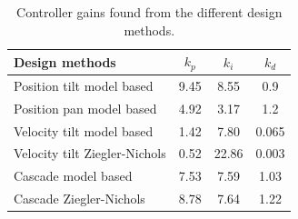 \documentclass[../../main.tex]{subfiles}
\begin{document}
\begin{table}[]
    \centering
    \begin{tabular}{l | c c c}
        Design methods                      & $k_{p}$ & $k_{i}$ & $k_{d}$ \\
        \hline
        Position tilt model based   & 9.45 & 8.55 & 0.9     \\
        Position pan model based    & 4.92 & 3.17 & 1.2     \\
        Velocity tilt model based   & 1.42 & 7.80 & 0.065   \\
        Velocity tilt Ziegler-Nichols & 0.52 & 22.86 & 0.003 \\
        Cascade model based         & 7.53 & 7.59 & 1.03    \\
        Cascade Ziegler-Nichols     & 8.78 & 7.64 & 1.22    \\
    \end{tabular}
    \caption{Controller gains found from the different design methods. }
    \label{tab:pos_controller_gains}
\end{table}
\end{document}
